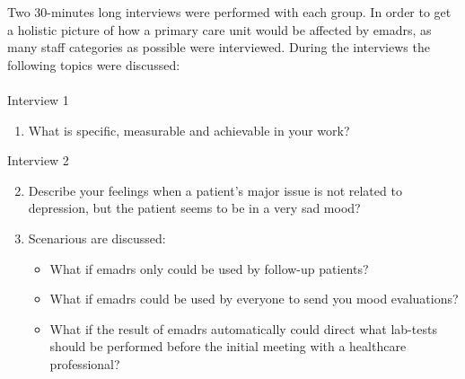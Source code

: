 \documentclass[12pt,a4paper,oneside]{article}
\let\oldcite\cite
\renewcommand*\cite[1]{\textsuperscript{\oldcite{#1}}}
\begin{document}
Two 30-minutes long interviews were performed with each group. In order to get a holistic picture of how a primary care unit would be affected by e{\sc madrs}, as many staff categories as possible were interviewed\cite{goal1}. During the interviews the following topics were discussed:\\\ \\
Interview 1
\begin{enumerate}[label=\bf \Alph*.]
\item {\bf} What is specific, measurable and achievable in your work?
\end{enumerate}
Interview 2
\begin{enumerate}[label=\bf \Alph*.]\setcounter{enumi}{1}
\item {\bf} Describe your feelings when a patient's major issue is not related to depression, but the patient seems to be in a very sad mood? 
\item {\bf} Scenarious are discussed:
\begin{itemize}
\item {\bf} What if e{\sc madrs} only could be used by follow-up patients?
\item {\bf} What if e{\sc madrs} could be used by everyone to send you mood evaluations?
\item {\bf} What if the result of e{\sc madrs} automatically could direct what lab-tests should be performed before the initial meeting with a healthcare professional?
\end{itemize}
\end{enumerate}
\end{document}
